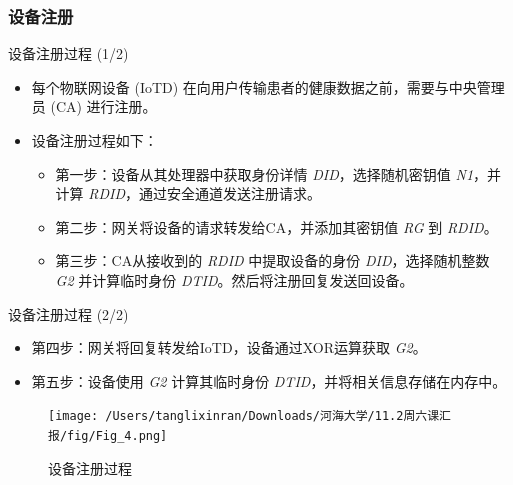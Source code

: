 \documentclass{beamer}
\begin{document}
\subsubsection{设备注册}
\begin{frame}{设备注册过程 (1/2)}
    \begin{itemize}
        \item 每个物联网设备 (IoTD) 在向用户传输患者的健康数据之前，需要与中央管理员 (CA) 进行注册。
        \item 设备注册过程如下：
        \begin{itemize}
            \item 第一步：设备从其处理器中获取身份详情 \textit{DID}，选择随机密钥值 \textit{N1}，并计算 \textit{RDID}，通过安全通道发送注册请求。
            \item 第二步：网关将设备的请求转发给CA，并添加其密钥值 \textit{RG} 到 \textit{RDID}。
            \item 第三步：CA从接收到的 \textit{RDID} 中提取设备的身份 \textit{DID}，选择随机整数 \textit{G2} 并计算临时身份 \textit{DTID}。然后将注册回复发送回设备。
        \end{itemize}
    \end{itemize}
\end{frame}

\begin{frame}{设备注册过程 (2/2)}
    \begin{itemize}
        \item 第四步：网关将回复转发给IoTD，设备通过XOR运算获取 \textit{G2}。
        \item 第五步：设备使用 \textit{G2} 计算其临时身份 \textit{DTID}，并将相关信息存储在内存中。
    \end{itemize}

    \begin{figure}
        \centering
        \texttt{[image: /Users/tanglixinran/Downloads/河海大学/11.2周六课汇报/fig/Fig\_4.png]} %
        \caption{设备注册过程}
    \end{figure}
\end{frame}
\end{document}
